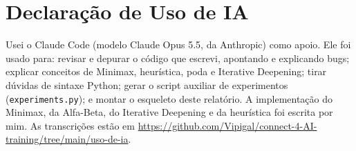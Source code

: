 \documentclass[letterpaper]{article} %
\begin{document}
\section{Declaração de Uso de IA}
Usei o Claude Code (modelo Claude Opus 5.5, da Anthropic) como apoio. Ele foi usado para: revisar e depurar o código que escrevi, apontando e explicando bugs; explicar conceitos de Minimax, heurística, poda e Iterative Deepening; tirar dúvidas de sintaxe Python; gerar o script auxiliar de experimentos (\texttt{experiments.py}); e montar o esqueleto deste relatório. A implementação do Minimax, da Alfa-Beta, do Iterative Deepening e da heurística foi escrita por mim. As transcrições estão em \url{https://github.com/Vipigal/connect-4-AI-training/tree/main/uso-de-ia}.
\end{document}
